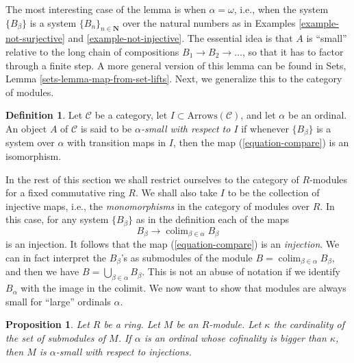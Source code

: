 \documentclass{stacks-project}
\theoremstyle{plain}
\newtheorem{proposition}[subsection]{Proposition}
\theoremstyle{definition}
\newtheorem{definition}[subsection]{Definition}
\theoremstyle{remark}
\numberwithin{equation}{subsection}
\def\colim{\mathop{\mathrm{colim}}\nolimits}
\begin{document}
\noindent
The most interesting case of the lemma is when $\alpha = \omega$, i.e.,
when the system $\{B_\beta\}$ is a system $\{B_n\}_{n \in \mathbf{N}}$
over the natural numbers as in
Examples \ref{example-not-surjective} and
\ref{example-not-injective}.
The essential idea is that $A$ is ``small'' relative to the long chain of
compositions $B_1 \to B_2 \to \ldots$, so that it has to factor through a
finite step. A more general version of this lemma can be found in
Sets, Lemma \ref{sets-lemma-map-from-set-lifts}.
Next, we generalize this to the category of modules.

\begin{definition}
\label{definition-small}
Let $\mathcal{C}$ be a category, let $I \subset \text{Arrows}(\mathcal{C})$,
and let $\alpha$ be an ordinal. An object $A$ of $\mathcal{C}$ is said to
be {\it $\alpha$-small with respect to $I$} if whenever $\{B_\beta\}$ is
a system over $\alpha$ with transition maps in $I$, then
the map (\ref{equation-compare}) is an isomorphism.
\end{definition}

\noindent
In the rest of this section we shall restrict ourselves
to the category of $R$-modules for a fixed commutative ring $R$.
We shall also take $I$ to be the collection of injective maps, i.e., the
{\it monomorphisms} in the category of modules over $R$. In this case, for
any system $\{B_\beta\}$ as in the definition each of the maps
$$
B_\beta \to \colim_{\beta \in \alpha} B_\beta
$$
is an injection. It follows that the map (\ref{equation-compare}) is an
{\it injection}. We can in fact interpret the $B_\beta$'s as submodules
of the module $B = \colim_{\beta \in \alpha} B_\beta$, and then we
have $B = \bigcup_{\beta \in \alpha} B_\beta$. This is not an abuse of
notation if we identify $B_\alpha$ with the image in the colimit.
We now want to show that modules are always small for ``large'' ordinals
$\alpha$.

\begin{proposition}
\label{proposition-modules-are-small}
Let $R$ be a ring. Let $M$ be an $R$-module.
Let $\kappa$ the cardinality of the set of submodules of $M$.
If $\alpha$ is an ordinal whose cofinality is bigger than $\kappa$,
then $M$ is $\alpha$-small with respect to injections.
\end{proposition}
\end{document}
